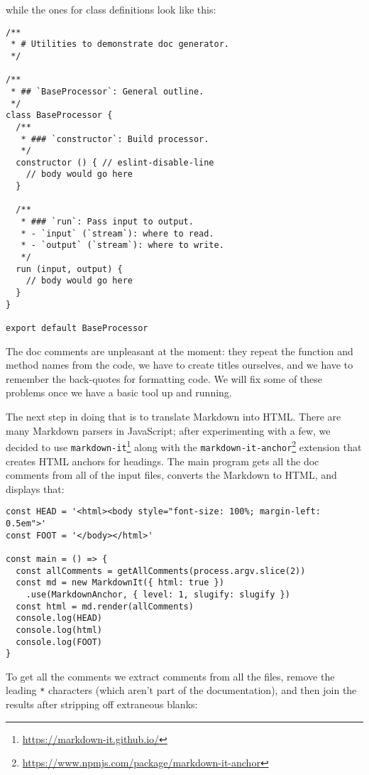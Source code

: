 \documentclass[krantzl]{krantz}
\newcommand{\hreffoot}[2]{{#1}\footnote{\href{#2}{#2}}}
\begin{document}
\noindent while the ones for class definitions look like this:


\begin{lstlisting}[frame=single,frameround=tttt]
/**
 * # Utilities to demonstrate doc generator.
 */

/**
 * ## `BaseProcessor`: General outline.
 */
class BaseProcessor {
  /**
   * ### `constructor`: Build processor.
   */
  constructor () { // eslint-disable-line
    // body would go here
  }

  /**
   * ### `run`: Pass input to output.
   * - `input` (`stream`): where to read.
   * - `output` (`stream`): where to write.
   */
  run (input, output) {
    // body would go here
  }
}

export default BaseProcessor
\end{lstlisting}



The doc comments are unpleasant at the moment:
they repeat the function and method names from the code,
we have to create titles ourselves,
and we have to remember the back-quotes for formatting code.
We will fix some of these problems once we have a basic tool up and running.


The next step in doing that is to translate Markdown into HTML.
There are many Markdown parsers in JavaScript;
after experimenting with a few,
we decided to use \hreffoot{\texttt{markdown-it}}{https://markdown-it.github.io/}
along with the \hreffoot{\texttt{markdown-it-anchor}}{https://www.npmjs.com/package/markdown-it-anchor} extension
that creates HTML anchors for headings.
The main program gets all the doc comments from all of the input files,
converts the Markdown to HTML,
and displays that:


\begin{lstlisting}[frame=single,frameround=tttt]
const HEAD = '<html><body style="font-size: 100%; margin-left: 0.5em">'
const FOOT = '</body></html>'

const main = () => {
  const allComments = getAllComments(process.argv.slice(2))
  const md = new MarkdownIt({ html: true })
    .use(MarkdownAnchor, { level: 1, slugify: slugify })
  const html = md.render(allComments)
  console.log(HEAD)
  console.log(html)
  console.log(FOOT)
}
\end{lstlisting}



To get all the comments
we extract comments from all the files,
remove the leading \texttt{*} characters (which aren't part of the documentation),
and then join the results after stripping off extraneous blanks:
\end{document}

